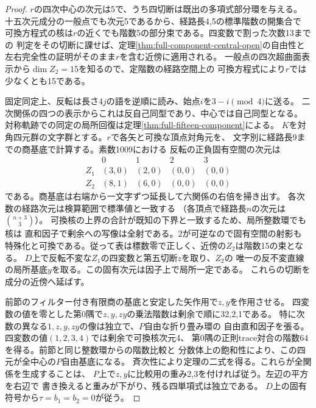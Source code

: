 \begin{proof}
$r$の四次中心の次元は5で、うち四切断は既出の多項式部分環を与える。
十五次元成分の一般点でも次元5であるから、経路長4,5の標準階数の開集合で
可換方程式の核は$r$の近くでも階数5の部分束である。四変数で割った次数13までの
判定をその切断に課せば、定理\ref{thm:full-component-central-open}の自由性と
左右完全性の証明がそのまま$r$を含む近傍に適用される。
一般点の四次超曲面表示から$\dim Z_2=15$を知るので、定階数の経路空間上の
可換方程式により$r$では少なくとも15である。

固定同定上、反転は長さ$4j$の語を逆順に読み、始点$i$を$3-i\pmod4$に送る。
二次関係の四つの表示からこれは反自己同型であり、中心では自己同型となる。
対称軌跡での同定の局所回復は定理\ref{thm:full-fifteen-component}による。
$K$を対角四元群の文字群とする。$r$で各矢と可換な頂点対角元を、
文字別に経路長9までの商基底で計算する。素数1009における
反転の正負固有空間の次元は
\[
\begin{array}{c|cccc}
 &0&1&2&3\\\hline
 Z_1&(3,0)&(2,0)&(0,0)&(0,0)\\
 Z_2&(8,1)&(6,0)&(0,0)&(0,0)
\end{array}
\]
である。商基底は右端から一文字ずつ延長して六関係の右倍を掃き出す。
各次数の経路次元は検算範囲で標準値と一致する
（各頂点で経路長$n$の次元は$\binom{n+3}{3}$）。
可換核の上界の合計が既知の下界と一致するため、局所整数環でも核は
直和因子で剰余への写像は全射である。$2$が可逆なので固有空間の射影も
特殊化と可換である。従って表は標数零で正しく、近傍の$Z_2$は階数15の束となる。
$D$上で反転不変な$Z_1$の四変数と第五切断$z$を取り、$Z_2$の
唯一の反不変直線の局所基底$y$を取る。この固有次元は因子上で局所一定である。
これらの切断を成分の近傍へ延ばす。

前節のフィルター付き有限商の基底と安定した矢作用で$z,y$を作用させる。
四変数の値を零とした第0隅で$z,y,zy$の乗法階数は剰余で順に32,2,1である。
特に次数の異なる$1,z,y,zy$の像は独立で、$P$自由な折り畳み環の
自由直和因子を張る。四変数の値$(1,2,3,4)$では剰余で可換核次元4、
第0隅の正則trace対合の階数64を得る。前節と同じ整数環からの階数比較と
分数体上の飽和性により、この四元が全中心の$P$自由基底になる。
斉次性により定理の二式を得る。これらが全関係を生成することは、
$P$上で$z,y$に比較用の重み2,3を付ければ従う。左辺の平方を右辺で
書き換えると重みが下がり、残る四単項式は独立である。
$D$上の固有符号から$\tau=b_1=b_2=0$が従う。


\end{proof}
